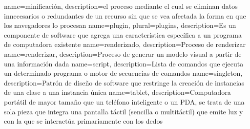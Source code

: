 {
    name=minificación,
    description={el proceso mediante el cual se eliminan datos innecesarios o redundantes de un recurso sin que se vea afectada la forma en que los navegadores lo procesan}
}
{
    name=plugin,
    plural=plugins,
    description={Es un componente de software que agrega una característica específica a un programa de computadora existente}
}
{
    name=renderizado,
    description={Proceso de renderizar}
}
{
    name=renderizar,
    description={Proceso de generar un modelo visual a partir de una información dada}
}
{
    name=script,
    description={Lista de comandos que ejecuta un determinado programa o motor de secuencias de comandos}
}
{
    name=singleton,
    description={Patrón de diseño de software que restringe la creación de instancias de una clase a una instancia única}
}
{
    name=tablet,
    description={Computadora portátil de mayor tamaño que un teléfono inteligente o un PDA, se trata de una sola pieza que integra una pantalla táctil (sencilla o multitáctil) que emite luz y con la que se interactúa primariamente con los dedos}
}